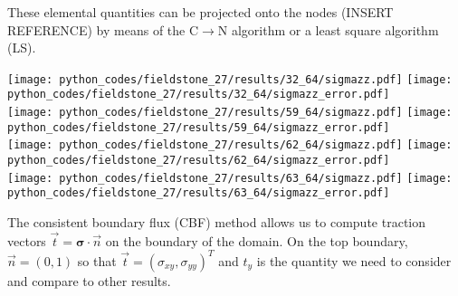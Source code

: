 These elemental quantities can be projected onto the nodes (INSERT REFERENCE)
by means of the C$\rightarrow$N algorithm or a least square algorithm (LS). 

\begin{center}
\texttt{[image: python\_codes/fieldstone\_27/results/32\_64/sigmazz.pdf]}
\texttt{[image: python\_codes/fieldstone\_27/results/32\_64/sigmazz\_error.pdf]}\\
\texttt{[image: python\_codes/fieldstone\_27/results/59\_64/sigmazz.pdf]}
\texttt{[image: python\_codes/fieldstone\_27/results/59\_64/sigmazz\_error.pdf]}\\
\texttt{[image: python\_codes/fieldstone\_27/results/62\_64/sigmazz.pdf]}
\texttt{[image: python\_codes/fieldstone\_27/results/62\_64/sigmazz\_error.pdf]}\\
\texttt{[image: python\_codes/fieldstone\_27/results/63\_64/sigmazz.pdf]}
\texttt{[image: python\_codes/fieldstone\_27/results/63\_64/sigmazz\_error.pdf]}
\end{center}

The consistent boundary flux (CBF) method allows us to compute traction vectors $\vec{t}={\bm \sigma}\cdot\vec{n}$
on the boundary of the domain. On the top boundary, $\vec{n}=(0,1)$ so that $\vec{t}=(\sigma_{xy}, \sigma_{yy})^T$ and 
$t_y$ is the quantity we need to consider and compare to other results.

